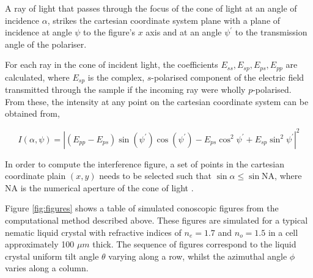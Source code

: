A ray of light that passes through the focus of the cone of light at an angle of incidence $\alpha$, strikes the cartesian coordinate system plane with a plane of incidence at angle $\psi$ to the figure's $x$ axis and at an angle $\psi^{\prime}$ to the transmission angle of the polariser. 

For each ray in the cone of incident light, the coefficients $E_{ss},E_{sp},E_{ps},E_{pp}$ are calculated, where $E_{sp}$ is the complex, $s$-polarised component of the electric field transmitted through the sample if the incoming ray were wholly $p$-polarised. From these, the intensity at any point on the cartesian coordinate system can be obtained \cite{Cornford2008} from,

\begin{widetext}
\begin{equation}
I\left(\alpha,\psi\right)=\left|\left(E_{pp}-E_{ps}\right)\sin\left(\psi^{\prime}\right)\cos\left(\psi^{\prime}\right)-E_{ps}\cos^2\psi^{\prime}+E_{sp}\sin^2\psi^{\prime}\right|^2
\end{equation}
\end{widetext}

In order to compute the interference figure, a set of points in the cartesian coordinate plain $\left(x,y\right)$ needs to be selected such that $\sin\alpha\leq\sin\text{NA}$, where NA is the numerical aperture of the cone of light \cite{Cornford2008}.

Figure \ref{fig:figures} shows a table of simulated conoscopic figures from the computational method described above. These figures are simulated for a typical nematic liquid crystal with refractive indices of $n_e=1.7$ and $n_o=1.5$ in  a cell approximately 100 $\mu m$ thick. The sequence of figures correspond to the liquid crystal uniform tilt angle $\theta$ varying along a row, whilst the azimuthal angle $\phi$ varies along a column.

